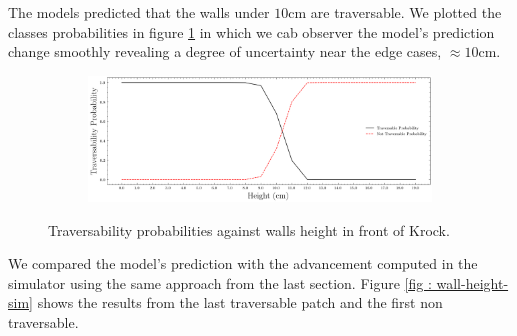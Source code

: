 \documentclass[../document.tex]{subfiles}
\begin{document}
The models predicted that the walls under $10$cm are traversable. We plotted the classes probabilities in figure \ref{fig : walls-height-preds} in which we cab observer the model's prediction change smoothly revealing a degree of uncertainty near the edge cases, $\approx 10$cm.
\begin{figure}[htbp]
    \centering
\begin{subfigure}[b]{1\linewidth}
    \includegraphics[width=\linewidth]{../img/5/custom_patches/walls_increasing/predictions.png}
    \end{subfigure}
    \caption{Traversability probabilities against walls height in front of Krock.}
\label{fig : walls-height-preds}
\end{figure}
We compared the model's prediction with the advancement computed in the simulator using the same approach from the last section. Figure \ref{fig : wall-height-sim} shows the results from the last traversable patch and the first non traversable.
\end{document}
